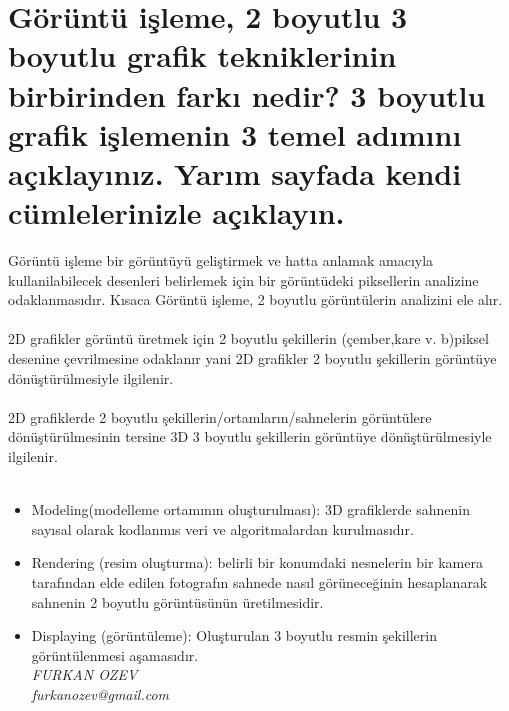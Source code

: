 \documentclass[a4paper, 12pt]{article}
\begin{document}
\section{Görüntü işleme, 2 boyutlu 3 boyutlu grafik tekniklerinin birbirinden farkı nedir? 3 boyutlu grafik
işlemenin 3 temel adımını açıklayınız. Yarım sayfada kendi cümlelerinizle açıklayın.}
Görüntü işleme bir görüntüyü geliştirmek ve hatta anlamak amacıyla kullanilabilecek desenleri belirlemek için bir görüntüdeki piksellerin analizine odaklanmasıdır. Kısaca Görüntü işleme, 2 boyutlu görüntülerin analizini ele alır. \\ \\
2D grafikler görüntü üretmek için 2 boyutlu şekillerin (çember,kare v. b)piksel desenine çevrilmesine odaklanır yani 2D grafikler 2 boyutlu şekillerin görüntüye dönüştürülmesiyle ilgilenir. \\ \\
2D grafiklerde 2 boyutlu şekillerin/ortamların/sahnelerin görüntülere dönüştürülmesinin tersine 3D 3 boyutlu şekillerin görüntüye dönüştürülmesiyle ilgilenir. \\ \\
\begin{itemize}  
\item Modeling(modelleme ortamının oluşturulması): 3D grafiklerde sahnenin sayısal olarak kodlanmıs veri ve algoritmalardan kurulmasıdır.\\
\item Rendering (resim oluşturma): belirli bir konumdaki nesnelerin bir kamera tarafından elde edilen fotografın sahnede nasıl görüneceğinin hesaplanarak sahnenin 2 boyutlu görüntüsünün üretilmesidir. \\
\item Displaying (görüntüleme): Oluşturulan 3 boyutlu resmin şekillerin görüntülenmesi aşamasıdır. \\
\center \em FURKAN OZEV \\
\center \em furkanozev@gmail.com

 \end{itemize}
\end{document}

